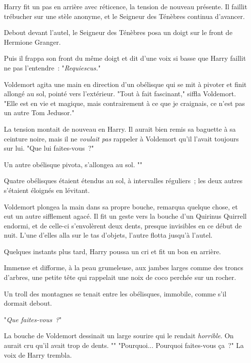 Harry fit un pas en arrière avec réticence, la tension de nouveau présente. Il faillit trébucher sur une stèle anonyme, et le Seigneur des Ténèbres continua d'avancer.

Debout devant l'autel, le Seigneur des Ténèbres posa un doigt sur le front de Hermione Granger.

Puis il frappa son front du même doigt et dit d'une voix si basse que Harry faillit ne pas l'entendre~: "\emph{Requiescus.}"

Voldemort agita une main en direction d'un obélisque qui se mit à pivoter et finit allongé au sol, pointé vers l'extérieur. "Tout à fait fascinant," siffla Voldemort. "Elle est en vie et magique, mais contrairement à ce que je craignais, ce n'est pas un autre Tom Jedusor."

La tension montait de nouveau en Harry. Il aurait bien remis sa baguette à sa ceinture noire, mais il ne \emph{voulait pas} rappeler à Voldemort qu'il l'avait toujours sur lui. "Que lui faites-vous~?"

Un autre obélisque pivota, s'allongea au sol. ""

Quatre obélisques étaient étendus au sol, à intervalles réguliers~; les deux autres s'étaient éloignés en lévitant.

Voldemort plongea la main dans sa propre bouche, remarqua quelque chose, et eut un autre sifflement agacé. Il fit un geste vers la bouche d'un Quirinus Quirrell endormi, et de celle-ci s'envolèrent deux dents, presque invisibles en ce début de nuit. L'une d'elles alla sur le tas d'objets, l'autre flotta jusqu'à l'autel.

Quelques instants plus tard, Harry poussa un cri et fit un bon en arrière.

Immense et difforme, à la peau grumeleuse, aux jambes larges comme des troncs d'arbres, une petite tête qui rappelait une noix de coco perchée sur un rocher.

Un troll des montagnes se tenait entre les obélisques, immobile, comme s'il dormait debout.

"\emph{Que faites-vous~?}"

La bouche de Voldemort dessinait un large sourire qui le rendait \emph{horrible}. On aurait cru qu'il avait trop de dents. ""
"Pourquoi... Pourquoi faites-vous ça~?" La voix de Harry trembla.

